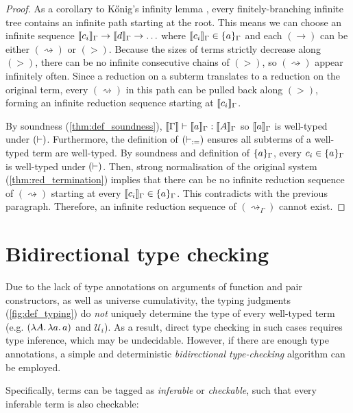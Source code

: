 \documentclass[twoside]{report}
\begin{document}
\begin{proof}
    As a corollary to Kőnig's infinity lemma \cite{konig1927schlussweise}, every finitely-branching infinite tree contains an infinite path starting at the root. This means we can choose an infinite sequence $\llbracket{c_i}\rrbracket_\Gamma \to \llbracket{d}\rrbracket_\Gamma \to \ldots$ where $\llbracket{c_i}\rrbracket_\Gamma \in \{{a}\}_\Gamma$ and each $(\to)$ can be either $(\rightsquigarrow)$ or $(>)$. Because the sizes of terms strictly decrease along $(>)$, there can be no infinite consecutive chains of $(>)$, so $(\rightsquigarrow)$ appear infinitely often. Since a reduction on a subterm translates to a reduction on the original term, every $(\rightsquigarrow)$ in this path can be pulled back along $(>)$, forming an infinite reduction sequence starting at $\llbracket{c_i}\rrbracket_\Gamma$.

    By soundness (\cref{thm:def_soundness}), $\llbracket{\Gamma}\rrbracket \vdash \llbracket{a}\rrbracket_\Gamma : \llbracket{A}\rrbracket_\Gamma$ so $\llbracket{a}\rrbracket_\Gamma$ is well-typed under $(\vdash)$. Furthermore, the definition of $(\vdash_{:=})$ ensures all subterms of a well-typed term are well-typed. By soundness and definition of $\{{a}\}_\Gamma$, every $c_i\in\{{a}\}_\Gamma$ is well-typed under $(\vdash)$. Then, strong normalisation of the original system (\cref{thm:red_termination}) implies that there can be no infinite reduction sequence of $(\rightsquigarrow)$ starting at every $\llbracket{c_i}\rrbracket_\Gamma \in \{{a}\}_\Gamma$. This contradicts with the previous paragraph. Therefore, an infinite reduction sequence of $(\rightsquigarrow_\Gamma)$ cannot exist.
\end{proof}

\section{Bidirectional type checking}
\label{sec:bidirectional_type_checking}

Due to the lack of type annotations on arguments of function and pair constructors, as well as universe cumulativity, the typing judgments (\cref{fig:def_typing}) do \emph{not} uniquely determine the type of every well-typed term (e.g. $(\lambda{A}.\,{\lambda{a}.\,{a}})$ and $\mathcal U_i$). As a result, direct type checking in such cases requires type inference, which may be undecidable. However, if there are enough type annotations, a simple and deterministic \emph{bidirectional type-checking} algorithm can be employed.

Specifically, terms can be tagged as \emph{inferable} or \emph{checkable}, such that every inferable term is also checkable:
\end{document}
